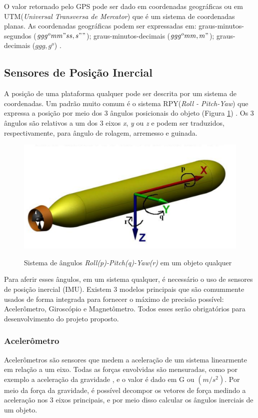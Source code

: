 O valor retornado pelo GPS pode ser dado em coordenadas geográficas ou em UTM(\textit{Universal Transversa de Mercator}) que é um sistema de coordenadas planas. As coordenadas geográficas podem ser expressadas em: graus-minutos-segundos ($ ggg^o mm" ss,s"" $); graus-minutos-decimais ($ ggg^o mm,m" $); graus-decimais ($ ggg,g^o $) \cite{apostilagps}. 


\subsection{Sensores de Posição Inercial}

A posição de uma plataforma qualquer pode ser descrita por um sistema de coordenadas. Um padrão muito comum é o sistema RPY(\textit{Roll - Pitch-Yaw}) que expressa a posição por meio dos 3 ângulos posicionais do objeto (Figura \ref{fig:RPY}) \cite{diss:FabioAUV}. Os 3 ângulos são relativos a um dos 3 eixos \textit{x}, \textit{y} ou \textit{z} e podem ser traduzidos, respectivamente, para ângulo de rolagem, arremesso e guinada.

\begin{figure}[!htb]
	\centering
	\caption{Sistema de ângulos \textit{Roll(p)-Pitch(q)-Yaw(r)} em um objeto qualquer}
	\includegraphics[width=0.7\linewidth]{figuras/coordenadasRPY}
	\label{fig:RPY}
\end{figure}

Para aferir esses ângulos, em um sistema qualquer, é necessário o uso de sensores de posição inercial (IMU). Existem 3 modelos principais que são comummente usados de forma integrada para fornecer o máximo de precisão possível: Acelerômetro, Giroscópio e Magnetômetro. Todos esses serão obrigatórios para desenvolvimento do projeto proposto.

\subsubsection{Acelerômetro}

Acelerômetros são sensores que medem a aceleração de um sistema linearmente em relação a um eixo. Todas as forças envolvidas são mensuradas, como por exemplo a aceleração da gravidade \cite{diss:FabioAUV}, e o valor é dado em G ou $ (m/s^2) $. Por meio da força da gravidade, é possível decompor os vetores de força medindo a aceleração nos 3 eixos principais, e por meio disso calcular os ângulos inerciais de um objeto.


